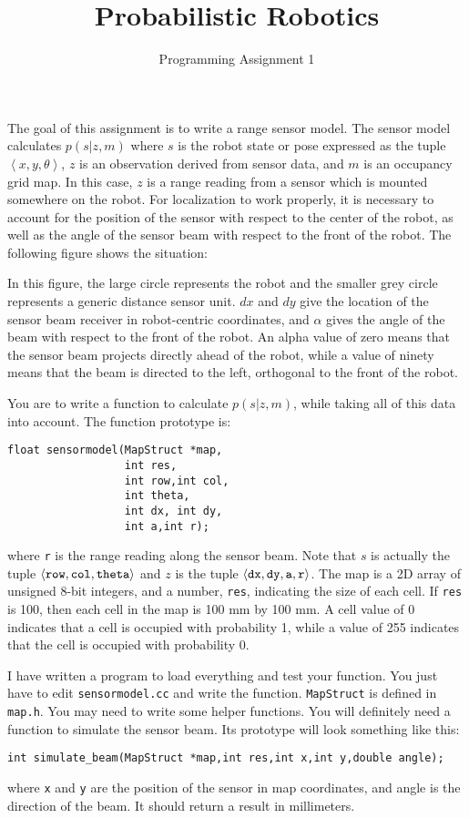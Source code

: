 \documentclass[letterpaper,12pt]{article}
\title{Probabilistic Robotics}
\author{Programming Assignment 1}
\newcommand{\tuple}[1]{\ensuremath{\left \langle #1 \right \rangle }}
\begin{document}
\maketitle

The goal of this assignment is to write a range sensor model.  The
sensor model calculates $p(s|z,m)$ where $s$ is the robot state or
pose expressed as the tuple $\tuple{x,y,\theta}$, $z$ is an
observation derived from sensor data, and $m$ is an occupancy grid
map.  In this case, $z$ is a range reading from a sensor which is
mounted somewhere on the robot.  For localization to work properly, it
is necessary to account for the position of the sensor with respect to
the center of the robot, as well as the angle of the sensor beam with
respect to the front of the robot.  The following figure shows the
situation:

\begin{center}
  
  \end{center}

In this figure, the large circle represents the robot and the
smaller grey circle represents a generic distance sensor unit.
$dx$ and $dy$ give the location of the sensor beam receiver
in robot-centric coordinates, and $\alpha$ gives the angle of the
beam with respect to the front of the robot.  An alpha value
of zero means that the sensor beam projects directly ahead of
the robot, while a value of ninety means that the beam is
directed to the left, orthogonal to the front of the robot.

You are to write a function to calculate $p(s|z,m)$, while
taking all of this data into account.  The function
prototype is:
\begin{lstlisting}
float sensormodel(MapStruct *map,
                  int res,
                  int row,int col,
                  int theta,
                  int dx, int dy,
                  int a,int r);
\end{lstlisting}
where \lstinline{r} is the range reading along the sensor beam.  Note
that $s$ is actually the tuple $\tuple{{\tt row},{\tt col},{\tt
    theta}}$ and $z$ is the tuple $\tuple{{\tt dx},{\tt dy},{\tt
    a},{\tt r}}$.  The map is a 2D array of unsigned 8-bit integers,
and a number, {\tt res}, indicating the size of each cell. If {\tt res}
is 100, then each cell in the map is 100 mm by 100 mm.
A cell value of 0 indicates that a cell is occupied with probability 1,
while a value of 255 indicates that the cell is occupied with
probability 0.

I have written a program to load everything and test your function.
You just have to edit {\tt sensormodel.cc} and write the function.
\lstinline{MapStruct} is defined in {\tt map.h}.  You may
need to write some helper functions.  You will definitely
need a function to simulate the sensor beam.  Its prototype will
look something like this:
\begin{lstlisting}
int simulate_beam(MapStruct *map,int res,int x,int y,double angle);
\end{lstlisting}
where {\tt x} and {\tt y}  are the position
of the sensor in map coordinates, and angle is the direction
of the beam.  It should return a result in millimeters.
\end{document}
